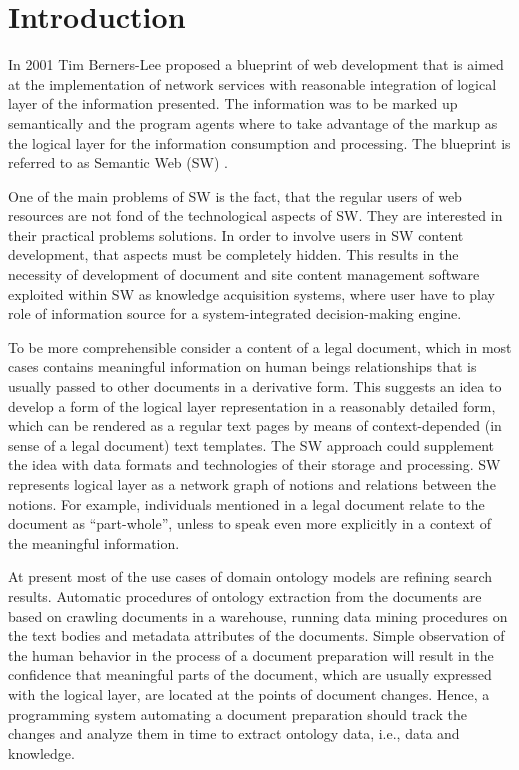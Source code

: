 \documentclass[conference]{IEEEtran}
\begin{document}
\section{Introduction}
In 2001 Tim Berners-Lee proposed a blueprint \cite{TBL2001} of web
development that is aimed at the implementation of network services
with reasonable integration of logical layer of the information
presented.  The information was to be marked up semantically and the
program agents where to take advantage of the markup as the logical
layer for the information consumption and processing.  The blueprint
is referred to as Semantic Web (SW) \cite{b1}.

One of the main problems of SW is the fact, that the regular users of
web resources are not fond of the technological aspects of SW.  They
are interested in their practical problems solutions.  In order to
involve users in SW content development, that aspects must be
completely hidden.  This results in the necessity of development of
document and site content management software exploited within SW as
knowledge acquisition systems, where user have to play role of
information source for a system-integrated decision-making engine.

To be more comprehensible consider a content of a legal document,
which in most cases contains meaningful information on human beings
relationships that is usually passed to other documents in a
derivative form.  This suggests an idea to develop a form of the
logical layer representation in a reasonably detailed form, which can
be rendered as a regular text pages by means of context-depended (in
sense of a legal document) text templates.  The SW approach could
supplement the idea with data formats and technologies of their
storage and processing.  SW represents logical layer as a network graph
of notions and relations between the notions.  For example, individuals
mentioned in a legal document relate to the document as
“part-whole”, unless to speak even more explicitly in a context of
the meaningful information.

At present most of the use cases of domain ontology models are
refining search results.  Automatic procedures of ontology extraction
from the documents are based on crawling documents in a warehouse,
running data mining procedures on the text bodies and metadata
attributes of the documents.  Simple observation of the human behavior
in the process of a document preparation will result in the confidence
that meaningful parts of the document, which are usually expressed
with the logical layer, are located at the points of document changes.
Hence, a programming system automating a document preparation should
track the changes and analyze them in time to extract ontology data,
i.e., data and knowledge.
\end{document}
